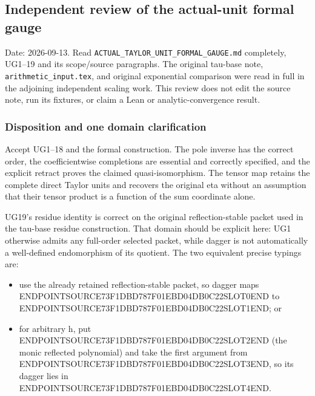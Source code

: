 \subsection{Independent review of the actual-unit formal gauge}\label{endpoint-f1_unit_gauge_review--independent-review-of-the-actual-unit-formal-gauge}

Date: 2026-09-13. Read \texttt{ACTUAL\_TAYLOR\_UNIT\_FORMAL\_GAUGE.md} completely, UG1--19 and its scope/source paragraphs. The original tau-base note, \texttt{arithmetic\_input.tex}, and original exponential comparison were read in full in the adjoining independent scaling work. This review does not edit the source note, run its fixtures, or claim a Lean or analytic-convergence result.

\subsubsection{Disposition and one domain clarification}\label{endpoint-f1_unit_gauge_review--disposition-and-one-domain-clarification}

Accept UG1--18 and the formal construction. The pole inverse has the correct order, the coefficientwise completions are essential and correctly specified, and the explicit retract proves the claimed quasi-isomorphism. The tensor map retains the complete direct Taylor units and recovers the original eta without an assumption that their tensor product is a function of the sum coordinate alone.

UG19's residue identity is correct on the original reflection-stable packet used in the tau-base residue construction. That domain should be explicit here: UG1 otherwise admits any full-order selected packet, while dagger is not automatically a well-defined endomorphism of its quotient. The two equivalent precise typings are:

\begin{itemize}
\tightlist
\item
  use the already retained reflection-stable packet, so dagger maps ENDPOINTSOURCE73F1DBD787F01EBD04DB0C22SLOT0END to ENDPOINTSOURCE73F1DBD787F01EBD04DB0C22SLOT1END; or
\item
  for arbitrary h, put ENDPOINTSOURCE73F1DBD787F01EBD04DB0C22SLOT2END (the monic reflected polynomial) and take the first argument from ENDPOINTSOURCE73F1DBD787F01EBD04DB0C22SLOT3END, so its dagger lies in ENDPOINTSOURCE73F1DBD787F01EBD04DB0C22SLOT4END.
\end{itemize}

